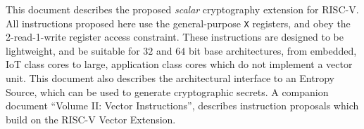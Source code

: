 
This document describes the proposed {\em scalar} cryptography
extension for RISC-V.
All instructions proposed here use the general-purpose {\tt X}
registers, and obey the 2-read-1-write register access constraint.
These instructions are designed to be lightweight, and be suitable
for $32$ and $64$ bit base architectures, from embedded, IoT class
cores to large, application class cores which do not implement a
vector unit.
This document also describes the architectural interface to an
Entropy Source, which can be used to generate cryptographic secrets.
A companion document ``Volume II: Vector Instructions'', describes
instruction proposals which build on the RISC-V Vector Extension.
